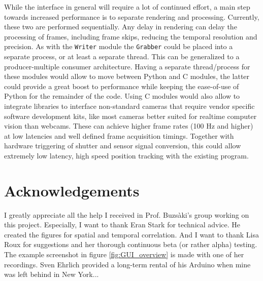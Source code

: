 While the interface in general will require a lot of continued effort, a main step towards increased performance is to separate rendering and processing. Currently, these two are performed sequentially. Any delay in rendering can delay the processing of frames, including frame skips, reducing the temporal resolution and precision. As with the \texttt{Writer} module the \texttt{Grabber} could be placed into a separate process, or at least a separate thread. This can be generalized to a producer-multiple consumer architecture. Having a separate thread/process for these modules would allow to move between Python and C modules, the latter could provide a great boost to performance while keeping the ease-of-use of Python for the remainder of the code. Using C modules would also allow to integrate libraries to interface non-standard cameras that require vendor specific software development kits, like most cameras better suited for realtime computer vision than webcams. These can achieve higher frame rates (100 Hz and higher) at low latencies and well defined frame acquisition timings. Together with hardware triggering of shutter and sensor signal conversion, this could allow extremely low latency, high speed position tracking with the existing program.

\section*{Acknowledgements}
\label{sec:acknowledgements}
I greatly appreciate all the help I received in Prof. Buzs\`aki's group working on this project. Especially, I want to thank Eran Stark for technical advice. He created the figures for spatial and temporal correlation. And I want to thank Lisa Roux for suggestions and her thorough continuous beta (or rather alpha) testing. The example screenshot in figure \ref{fig:GUI_overview} is made with one of her recordings. Sven Ehrlich provided a long-term rental of his Arduino when mine was left behind in New York...
%



